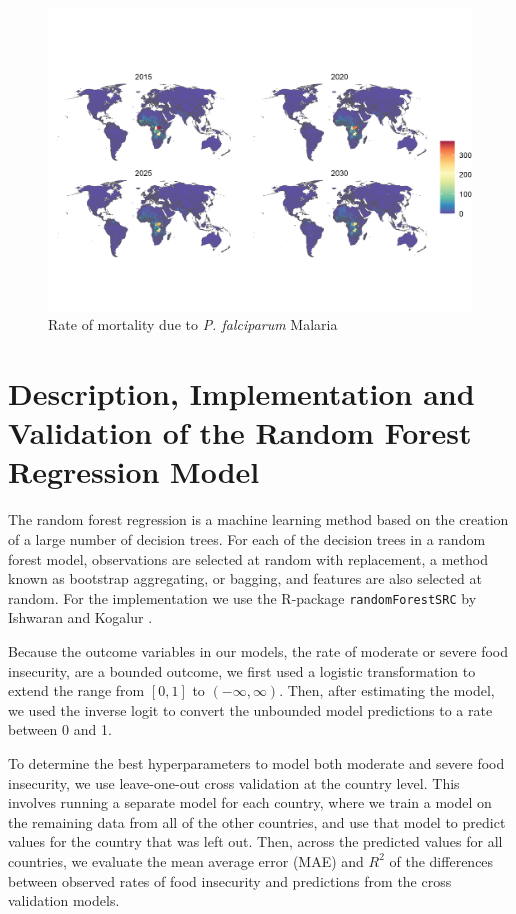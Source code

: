 \documentclass{article}
\begin{document}
\begin{figure}[H]
  \centering
  \includegraphics[width=\linewidth]{img/covars/mal_falciparum.png}
  \caption{Rate of mortality due to \textit{P. falciparum} Malaria}
\end{figure}

\pagebreak
\section{Description, Implementation and Validation of the Random Forest Regression Model}
The random forest regression is a machine learning method based on the creation of a large number of decision trees.  For each of the decision trees in a random forest model, observations are selected at random with replacement, a method known as bootstrap aggregating, or bagging, and features are also selected at random.  For the implementation we use the R-package \texttt{randomForestSRC} by Ishwaran and Kogalur \citep{ishwaran2019randomforestsrc}.

Because the outcome variables in our models, the rate of moderate or severe food insecurity, are a bounded outcome, we first used a logistic transformation to extend the range from $[0,1]$ to $(-\infty, \infty)$.  Then, after estimating the model, we used the inverse logit to convert the unbounded model predictions to a rate between 0 and 1.

To determine the best hyperparameters to model both moderate and severe food insecurity, we use leave-one-out cross validation at the country level.  This involves running a separate model for each country, where we train a model on the remaining data from all of the other countries, and use that model to predict values for the country that was left out.  Then, across the predicted values for all countries, we evaluate the mean average error (MAE) and $R^2$ of the differences between observed rates of food insecurity and predictions from the cross validation models.
\end{document}
